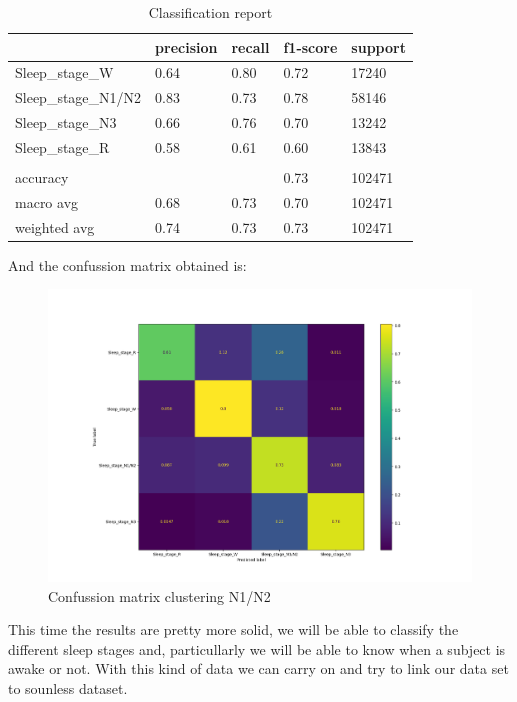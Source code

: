 \begin{table}[H]
\begin{center}
\begin{tabular}{ |p{3cm}||p{2cm}||p{2cm}||p{2cm}||p{2cm}| }
 \hline
 & precision & recall & f1-score & support\\
 \hline  
 Sleep\_stage\_W & 0.64 & 0.80 & 0.72 & 17240 \\
 Sleep\_stage\_N1/N2 & 0.83 & 0.73 & 0.78 & 58146 \\
 Sleep\_stage\_N3 & 0.66 & 0.76 & 0.70 & 13242 \\
 Sleep\_stage\_R & 0.58 & 0.61 & 0.60 & 13843 \\
 & & & & \\
 accuracy &  &  & 0.73 & 102471 \\
 macro avg & 0.68 & 0.73 & 0.70 & 102471 \\
 weighted avg & 0.74 & 0.73 & 0.73 & 102471 \\
 \hline
\end{tabular}
\end{center}
\caption{Classification report}
\label{tab4}
\end{table}

And the confussion matrix obtained is:

\begin{figure}[H]
\centering
\hspace*{-1cm}\includegraphics[scale=.42]{figs/cm-clustering.png}
\caption{Confussion matrix clustering N1/N2}
\label{fig8}
\end{figure}

This time the results are pretty more solid, we will be able to classify the different sleep stages and, particullarly we will be able to know when a subject is awake or not. With this kind of data we can carry on and try to link our data set to sounless dataset.

